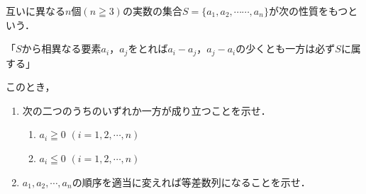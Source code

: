 \documentclass[../../main.tex]{subfiles}
\begin{document}
互いに異なる$n$個$(n \geqq 3)$の実数の集合$S=\{a_1,a_2,\cdots\cdots,a_n\}$が次の性質をもつという．
\begin{center}
  「$S$から相異なる要素$a_i$，$a_j$をとれば$a_i-a_j$，$a_j-a_i$の少くとも一方は必ず$S$に属する」
\end{center}
このとき，
\begin{enumerate}
  \item 次の二つのうちのいずれか一方が成り立つことを示せ．
    \begin{enumerate}
      \item $a_i \geqq 0$ $(i=1,2,\cdots,n)$
      \item $a_i \leqq 0$ $(i=1,2,\cdots,n)$
    \end{enumerate}
  \item $a_1,a_2,\cdots,a_n$の順序を適当に変えれば等差数列になることを示せ．
\end{enumerate}
\end{document}
